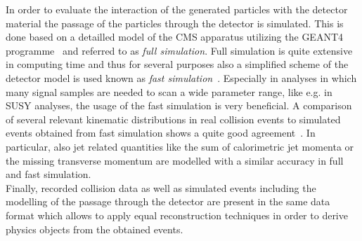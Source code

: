 In order to evaluate the interaction of the generated particles with the detector material the passage of the particles through the detector is simulated. This is done based on a detailled model of the CMS apparatus utilizing the GEANT4 programme~\cite{Agostinelli2003250} and referred to as \textit{full simulation}. Full simulation is quite extensive in computing time and thus for several purposes also a simplified scheme of the detector model is used known as \textit{fast simulation}~\cite{Abdullin:2011zz}. Especially in analyses in which many signal samples are needed to scan a wide parameter range, like e.g. in SUSY analyses, the usage of the fast simulation is very beneficial. A comparison of several relevant kinematic distributions in real collision events to simulated events obtained from fast simulation shows a quite good agreement~\cite{CMS-DP-2010-039}. In particular, also jet related quantities like the sum of calorimetric jet momenta or the missing transverse momentum are modelled with a similar accuracy in full and fast simulation. \\  
Finally, recorded collision data as well as simulated events including the modelling of the passage through the detector are present in the same data format which allows to apply equal reconstruction techniques in order to derive physics objects from the obtained events.


